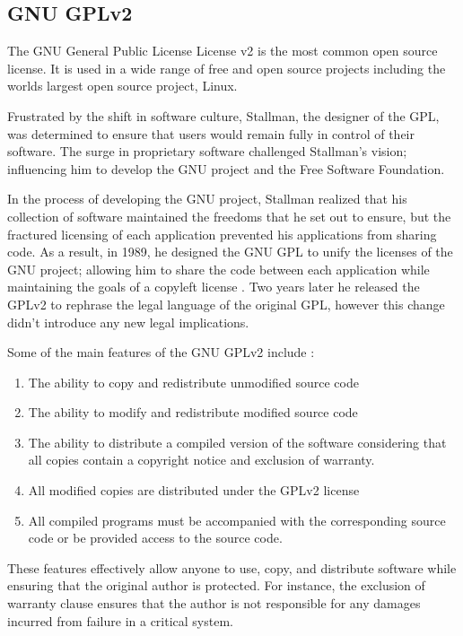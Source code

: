 \documentclass[12pt,letterpaper]{article}
\begin{document}
\subsection{GNU GPLv2}

The GNU General Public License License v2 is the most common open source license. It is used in a wide range of free and open source projects including the worlds largest open source project, Linux.

Frustrated by the shift in software culture, Stallman, the designer of the GPL, was determined to ensure that users would remain fully in control of their software. The surge in proprietary software challenged Stallman's vision; influencing him to develop the GNU project and the Free Software Foundation.

In the process of developing the GNU project, Stallman realized that his collection of software maintained the freedoms that he set out to ensure, but the fractured licensing of each application prevented his applications from sharing code. As a result, in 1989, he designed the GNU GPL to unify the licenses of the GNU project; allowing him to share the code between each application while maintaining the goals of a copyleft license \cite{gpl2}. Two years later he released the GPLv2 to rephrase the legal language of the original GPL, however this change didn't introduce any new legal implications.

Some of the main features of the GNU GPLv2 include \cite{gpl2}:
\begin{enumerate}
\item The ability to copy and redistribute unmodified source code
\item The ability to modify and redistribute modified source code
\item The ability to distribute a compiled version of the software considering that all copies contain a copyright notice and exclusion of warranty.
\item All modified copies are distributed under the GPLv2 license
\item All compiled programs must be accompanied with the corresponding source code or be provided access to the source code.
\end{enumerate}

These features effectively allow anyone to use, copy, and distribute software while ensuring that the original author is protected. For instance, the exclusion of warranty clause ensures that the author is not responsible for any damages incurred from failure in a critical system.
\end{document}
